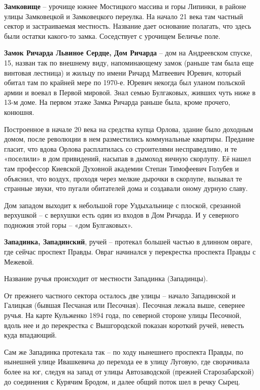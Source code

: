 \medskip

\textbf{Замковище} – урочище южнее Мостицкого массива и горы Липинки, в районе улицы Замковецкой и Замковецкого переулка. На начало 21 века там частный сектор и застраиваемая местность. Название дает основание полагать, что здесь были остатки какого-то замка. Соседствует с урочищем Беличье поле.\\

\medskip

\textbf{Замок Ричарда Львиное Сердце, Дом Ричарда} – дом на Андреевском спуске, 15, назван так по внешнему виду, напоминающему замок (раньше там была еще винтовая лестница) и жильцу по имени Ричард Матвеевич Юревич, который обитал там по крайней мере по 1970-е. Юревич некогда был уланом польской армии и воевал в Первой мировой. Знал семью Булгаковых, живших чуть ниже в 13-м доме. На первом этаже Замка Ричарда раньше была, кроме прочего, конюшня.

Построенное в начале 20 века на средства купца Орлова, здание было доходным домом, после революции в нем разместились коммунальные квартиры. Предание гласит, что вдова Орлова расплатилась со строителями несправедливо, и те «поселили» в дом привидений, насыпав в дымоход яичную скорлупу. Её нашел там профессор Киевской Духовной академии Степан Тимофеевич Голубев и объяснил, что воздух, проходя через мелкие дырочки в скорлупе, вызывал те странные
звуки, что пугали обитателей дома и создавали оному дурную славу.

Дом западом выходит к небольшой горе Уздыхальнице с плоской, срезанной верхушкой – с верхушки есть один из входов в Дом Ричарда. И у северного подножия этой горы – «дом Булгаковых».\\ 

\medskip

\textbf{Западинка, Западинский}, ручей – протекал большей частью в длинном овраге, где сейчас проспект Правды. Овраг начинался у перекрестка проспекта Правды с Межевой.
 
Название ручья происходит от местности Западинка (Западинцы). 

От прежнего частного сектора осталось две улицы – начало Западинской и Галицкая (бывшая Песчаная или Песочная). Песочная лежала выше, севернее ручья. На карте Кульженко 1894 года, по северной стороне улицы Песочной, вдоль нее и до перекрестка с Вышгородской показан короткий ручей, невесть куда впадающий.

Сам же Западинка протекала так – по ходу нынешнего проспекта Правды, по нынешней улице Ивашкевича до перехода ее в улицу Луговую, где сворачивала более на юг, следуя на запад от улицы Автозаводской (прежней Старозабарской) до соединения с Курячим Бродом, и далее общий поток шел в речку Сырец.

